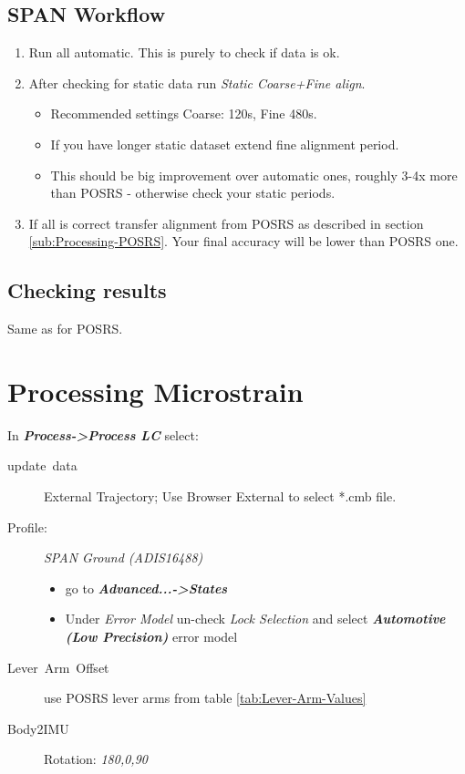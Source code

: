 \documentclass[11pt,fleqn]{book} %
\begin{document}
\subsection{SPAN Workflow\label{sub:SPAN-Workflow}}

\begin{enumerate}
\item Run all automatic. This is purely to check if data is ok.
\item After checking for static data run \emph{Static Coarse+Fine align}.
\begin{itemize}
 	\item Recommended settings Coarse: 120s, Fine 480s.
 	\item If you have longer static dataset extend fine alignment period. 
 	\item This should be big improvement over automatic ones, roughly 3-4x more than POSRS - otherwise check your static periods.
 \end{itemize}  
\item If all is correct transfer alignment from POSRS as described in section \ref{sub:Processing-POSRS}. Your final accuracy will be lower than POSRS one.
\end{enumerate}

\subsection{Checking results}

Same as for POSRS.

\section{Processing Microstrain}\label{sub:Processing-Microstrain}

In \textbf{\emph{Process->Process LC}} select:
\begin{description}
	\item [{update~data}] External Trajectory; Use Browser External to select {*}.cmb file.
	\item [{Profile:}] \emph{SPAN Ground (ADIS16488) }
		\begin{itemize}
			\item go to \textbf{\emph{Advanced...->States}}
			\item Under \emph{Error Model} un-check \emph{Lock Selection} and select \textbf{\emph{Automotive (Low Precision)}} error model
		\end{itemize}
	\item [{Lever~Arm~Offset}] use POSRS lever arms from table \ref{tab:Lever-Arm-Values}
	\item [{Body2IMU}] Rotation: \emph{180,0,90 }
\end{description}
\end{document}
